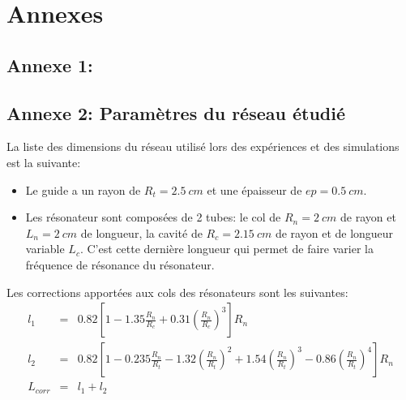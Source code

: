 \chapter*{Annexes}

\section*{Annexe 1: }
\section*{Annexe 2: Paramètres du réseau étudié }
La liste des dimensions du réseau utilisé lors des expériences et des simulations est la suivante:
\begin{itemize}
\item Le guide a un rayon de $R_t = 2.5~cm$ et une épaisseur de $ep = 0.5~cm$.
\item Les résonateur sont composées de 2 tubes: le col de $R_n = 2~cm$ de rayon et $L_n = 2~cm$ de longueur, la cavité de $R_c = 2.15~cm$ de rayon et de longueur variable $L_c$. C'est cette dernière longueur qui permet de faire varier la fréquence de résonance du résonateur. 
\end{itemize}

\bigskip
Les corrections apportées aux cols des résonateurs sont les suivantes:
\begin{eqnarray*}
l_1 & = &  0.82 \left[ 1 - 1.35 \frac{R_n}{R_c} + 0.31 \left(\frac{R_n}{R_c} \right)^3  \right] R_n \\
l_2 & = &  0.82 \left[ 1 - 0.235 \frac{R_n}{R_t} - 1.32 \left( \frac{R_n}{R_t} \right)^2 +1.54 \left( \frac{R_n}{R_t}\right)^3 - 0.86 \left( \frac{R_n}{R_t}\right)^4  \right] R_n \\
L_{corr} & = &  l_1 + l_2
\end{eqnarray*}
